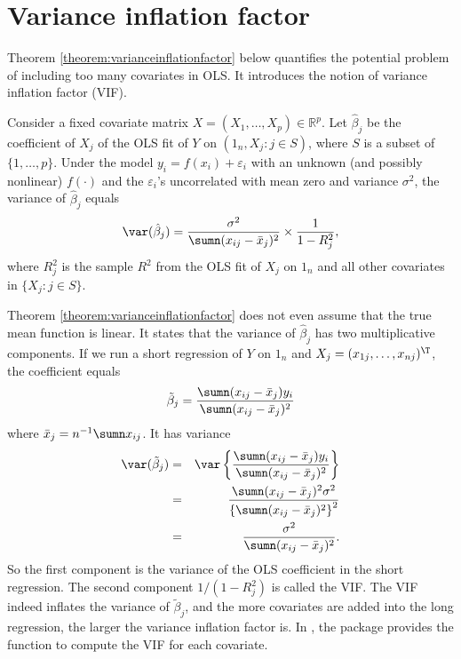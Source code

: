 \section{Variance inflation factor}
\label{section::vif-theorem}

Theorem \ref{theorem:varianceinflationfactor} below quantifies the potential problem of including too many covariates in OLS. 
It introduces the notion of variance inflation factor (VIF). 



\begin{theorem}
\label{theorem:varianceinflationfactor}
Consider a fixed covariate matrix $X = (X_1, \ldots, X_p) \in \mathbb{R}^p$.
Let $\hat{\beta}_{j}$ be the coefficient of $X_{j}$ of the OLS fit
of $Y$ on $(1_{n},X_{j}: j \in S ) $, where $S$ is a subset of $\{1, \ldots, p \}$. Under the
model $y_{i}=f(x_{i})+\varepsilon_{i}$ with an unknown (and possibly nonlinear) $f(\cdot)$ and the $\varepsilon_{i}$'s
uncorrelated with mean zero and variance $\sigma^{2}$, the variance
of $\hat{\beta}_{j}$ equals  
\[
\var(\hat{\beta}_{j})=\frac{\sigma^{2}}{\sumn(x_{ij}-\bar{x}_{j})^{2}}\times\frac{1}{1-R_{j}^{2}},
\]
where $R_{j}^{2}$ is the sample $R^{2}$ from the OLS fit of $X_{j}$
on $1_{n}$ and all other covariates in $\{X_{j}: j \in S\}$. 
\end{theorem}



Theorem \ref{theorem:varianceinflationfactor} does not even assume that the true mean function is linear. It 
states that the variance
of $\hat{\beta}_{j}$ has two multiplicative components. If we run
a short regression of $Y$ on $1_{n}$ and $X_{j} = (x_{1j}, \ldots, x_{nj})^{\T}$, the coefficient equals
\[
\tilde{\beta}_{j}=\frac{\sumn(x_{ij}-\bar{x}_{j})y_{i}}{\sumn(x_{ij}-\bar{x}_{j})^{2}}
\]
where $\bar{x}_{j} = n^{-1} \sumn x_{ij}$. It
has variance
\begin{eqnarray*}
\var(\tilde{\beta}_{j}) &=& \var\left\{ \frac{\sumn(x_{ij}-\bar{x}_{j})y_{i}}{\sumn(x_{ij}-\bar{x}_{j})^{2}}\right\} \\
&=&\frac{\sumn(x_{ij}-\bar{x}_{j})^{2}\sigma^{2}}{\left\{ \sumn(x_{ij}-\bar{x}_{j})^{2}\right\} ^{2}} \\
&=&\frac{\sigma^{2}}{\sumn(x_{ij}-\bar{x}_{j})^{2}}.
\end{eqnarray*}
So the first component is the variance of the OLS coefficient in the
short regression. The second component $1/(1-R_{j}^{2})$ is called
the VIF. The VIF indeed inflates the variance
of $\tilde{\beta}_{j}$, and the more covariates are added into the
long regression, the larger the variance inflation factor is. 
In , the  package provides the function  to compute the VIF for each covariate. 

